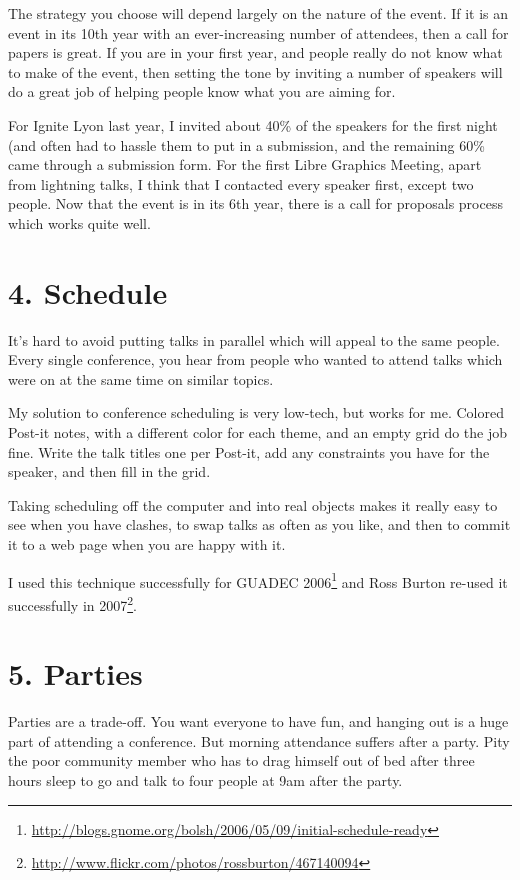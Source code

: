 The strategy you choose will depend largely on the nature of the event.
If it is an event in its 10th year with an ever-increasing number of
attendees, then a call for papers is great. If you are in your first
year, and people really do not know what to make of the event, then
setting the tone by inviting a number of speakers will do a great job of
helping people know what you are aiming for.

For Ignite Lyon last year, I invited about 40\% of the speakers for the
first night (and often had to hassle them to put in a submission, and
the remaining 60\% came through a submission form. For the first Libre
Graphics Meeting, apart from lightning talks, I think that I contacted
every speaker first, except two people. Now that the event is in its 6th year,
there is a call for proposals process which works quite well.

\section*{4. Schedule}

It's hard to avoid putting talks in parallel which will appeal to the same people. Every single conference, you hear from people who wanted to
attend talks which were on at the same time on similar topics.

My solution to conference scheduling is very low-tech, but works for me.
Colored Post-it notes, with a different color for each theme, and an empty
grid do the job fine. Write the talk titles one per Post-it, add any constraints you have for the speaker, and then fill in the grid.

Taking scheduling off the computer and into real objects makes it really
easy to see when you have clashes, to swap talks as often as you like,
and then to commit it to a web page when you are happy with it.

I used this technique successfully for GUADEC
2006\footnote{\url{
http://blogs.gnome.org/bolsh/2006/05/09/initial-schedule-ready}} and Ross
Burton re-used it successfully in
2007\footnote{\url{http://www.flickr.com/photos/rossburton/467140094}}.

\section*{5. Parties}

Parties are a trade-off. You want everyone to have fun, and hanging out
is a huge part of attending a conference. But morning attendance suffers
after a party. Pity the poor community member who has to drag himself
out of bed after three hours sleep to go and talk to four people at 9am after
the party.

